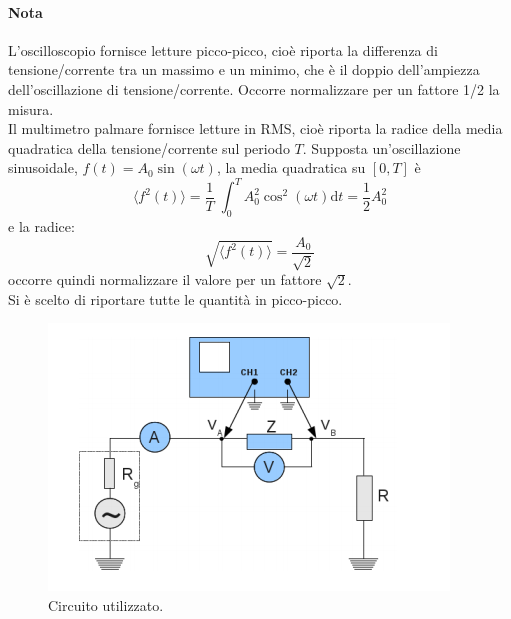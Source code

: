 \paragraph{Nota} {
L'oscilloscopio fornisce letture picco-picco, cioè riporta la differenza di tensione/corrente tra un massimo e un minimo, che è il doppio dell'ampiezza dell'oscillazione di tensione/corrente. Occorre normalizzare per un fattore 1/2 la misura. \\
Il multimetro palmare fornisce letture in RMS, cioè riporta la radice della media quadratica della tensione/corrente sul periodo $T$. Supposta un'oscillazione sinusoidale, $ f(t) = A_0 \sin(\omega t)$, la media quadratica su $[0,T]$ è
    $$\langle f^2(t) \rangle = \frac{1}{T} \; \int_0^{T} A_0^2 \cos^2(\omega t) \mathrm{d}t = \frac{1}{2}A_0^2$$
e la radice:
    $$ \sqrt{ \langle f^2(t) \rangle } = \frac{A_0}{\sqrt{2}}$$
occorre quindi normalizzare il valore per un fattore $\sqrt{2}$.\\
Si è scelto di riportare tutte le quantità in picco-picco.\\
%
\begin{figure}[H]
\centering
\includegraphics[scale=.6]{Grafici/C2_P1_circuito.png}
\caption{Circuito utilizzato.}
\label{fig:C2_P1_circuito}
\end{figure}

}
